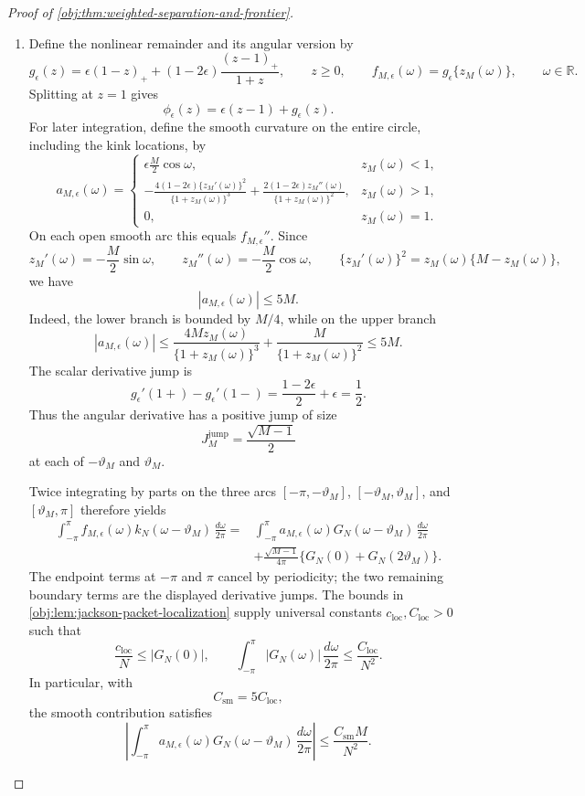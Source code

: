 \begin{proof}[Proof of \cref{obj:thm:weighted-separation-and-frontier}]
\begin{enumerate}
\item
Define the nonlinear remainder and its angular version by
\[
g_\epsilon(z)
=\epsilon(1-z)_+
 +(1-2\epsilon)\frac{(z-1)_+}{1+z},
\qquad z\ge0,
\qquad
f_{M,\epsilon}(\omega)=g_\epsilon\{z_M(\omega)\},
\qquad \omega\in\mathbb R.
\]
Splitting at \(z=1\) gives
\[
\phi_\epsilon(z)=\epsilon(z-1)+g_\epsilon(z).
\]
For later integration, define the smooth curvature on the entire circle, including the kink locations, by
\[
a_{M,\epsilon}(\omega)=
\begin{cases}
\displaystyle \epsilon\frac M2\cos\omega,
&z_M(\omega)<1,\\[4pt]
\displaystyle
-\frac{4(1-2\epsilon)\{z_M'(\omega)\}^2}
       {\{1+z_M(\omega)\}^3}
+\frac{2(1-2\epsilon)z_M''(\omega)}
       {\{1+z_M(\omega)\}^2},
&z_M(\omega)>1,\\[6pt]
0,&z_M(\omega)=1.
\end{cases}
\]
On each open smooth arc this equals \(f_{M,\epsilon}''\). Since
\[
z_M'(\omega)=-\frac M2\sin\omega,
\qquad
z_M''(\omega)=-\frac M2\cos\omega,
\qquad
\{z_M'(\omega)\}^2=z_M(\omega)\{M-z_M(\omega)\},
\]
we have
\[
|a_{M,\epsilon}(\omega)|\le5M.
\]
Indeed, the lower branch is bounded by \(M/4\), while on the upper branch
\[
|a_{M,\epsilon}(\omega)|
\le
\frac{4Mz_M(\omega)}{\{1+z_M(\omega)\}^3}
+\frac{M}{\{1+z_M(\omega)\}^2}
\le5M.
\]
The scalar derivative jump is
\[
g_\epsilon'(1+)-g_\epsilon'(1-)
=\frac{1-2\epsilon}{2}+\epsilon=\frac12.
\]
Thus the angular derivative has a positive jump of size
\[
J_M^{\mathrm{jump}}=\frac{\sqrt{M-1}}2
\]
at each of \(-\vartheta_M\) and \(\vartheta_M\).

Twice integrating by parts on the three arcs
\([-\pi,-\vartheta_M]\), \([-\vartheta_M,\vartheta_M]\), and
\([\vartheta_M,\pi]\) therefore yields
\[
\begin{aligned}
\int_{-\pi}^{\pi}
f_{M,\epsilon}(\omega)k_N(\omega-\vartheta_M)\,\frac{d\omega}{2\pi}
={}&
\int_{-\pi}^{\pi}
a_{M,\epsilon}(\omega)G_N(\omega-\vartheta_M)\,
\frac{d\omega}{2\pi}\\
&+\frac{\sqrt{M-1}}{4\pi}
 \{G_N(0)+G_N(2\vartheta_M)\}.
\end{aligned}
\]
The endpoint terms at \(-\pi\) and \(\pi\) cancel by periodicity; the two remaining boundary terms are the displayed derivative jumps. The bounds in
\cref{obj:lem:jackson-packet-localization} supply universal constants
\(c_{\mathrm{loc}},C_{\mathrm{loc}}>0\) such that
\[
\frac{c_{\mathrm{loc}}}{N}\le|G_N(0)|,
\qquad
\int_{-\pi}^{\pi}|G_N(\omega)|\,\frac{d\omega}{2\pi}
\le\frac{C_{\mathrm{loc}}}{N^2}.
\]
In particular, with
\[
C_{\mathrm{sm}}=5C_{\mathrm{loc}},
\]
the smooth contribution satisfies
\[
\left|
\int_{-\pi}^{\pi}
a_{M,\epsilon}(\omega)G_N(\omega-\vartheta_M)\,
\frac{d\omega}{2\pi}
\right|
\le\frac{C_{\mathrm{sm}}M}{N^2}.
\]


\end{enumerate}
\end{proof}
